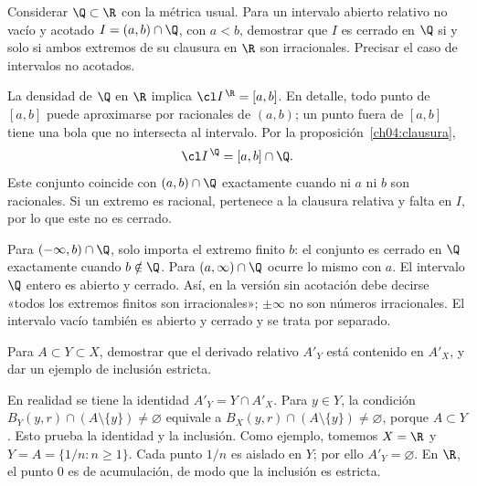 \begin{ejercicio}
Considerar $\Q\subset\R$ con la métrica usual. Para un intervalo abierto relativo no vacío y acotado $I=(a,b)\cap\Q$, con $a<b$, demostrar que $I$ es cerrado en $\Q$ si y solo si ambos extremos de su clausura en $\R$ son irracionales. Precisar el caso de intervalos no acotados.
\end{ejercicio}
\begin{solucion}
La densidad de $\Q$ en $\R$ implica $\cl I^{\,\R}=[a,b]$. En detalle, todo punto de $[a,b]$ puede aproximarse por racionales de $(a,b)$; un punto fuera de $[a,b]$ tiene una bola que no intersecta al intervalo. Por la proposición~\ref{ch04:clausura},
\[
\cl I^{\,\Q}=[a,b]\cap\Q.
\]
Este conjunto coincide con $(a,b)\cap\Q$ exactamente cuando ni $a$ ni $b$ son racionales. Si un extremo es racional, pertenece a la clausura relativa y falta en $I$, por lo que este no es cerrado.

Para $(-\infty,b)\cap\Q$, solo importa el extremo finito $b$: el conjunto es cerrado en $\Q$ exactamente cuando $b\notin\Q$. Para $(a,\infty)\cap\Q$ ocurre lo mismo con $a$. El intervalo $\Q$ entero es abierto y cerrado. Así, en la versión sin acotación debe decirse «todos los extremos finitos son irracionales»; $\pm\infty$ no son números irracionales. El intervalo vacío también es abierto y cerrado y se trata por separado.
\end{solucion}

\begin{ejercicio}
Para $A\subset Y\subset X$, demostrar que el derivado relativo $A'_Y$ está contenido en $A'_X$, y dar un ejemplo de inclusión estricta.
\end{ejercicio}
\begin{solucion}
En realidad se tiene la identidad $A'_Y=Y\cap A'_X$. Para $y\in Y$, la condición $B_Y(y,r)\cap(A\setminus\{y\})\ne\varnothing$ equivale a $B_X(y,r)\cap(A\setminus\{y\})\ne\varnothing$, porque $A\subset Y$. Esto prueba la identidad y la inclusión. Como ejemplo, tomemos $X=\R$ y $Y=A=\{1/n:n\ge1\}$. Cada punto $1/n$ es aislado en $Y$; por ello $A'_Y=\varnothing$. En $\R$, el punto $0$ es de acumulación, de modo que la inclusión es estricta.
\end{solucion}

